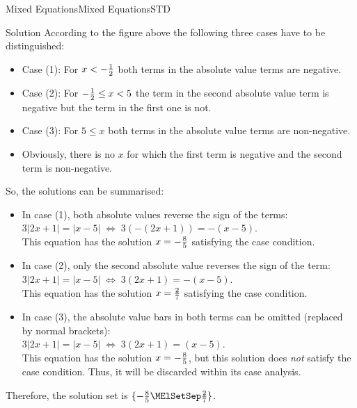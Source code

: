 \begin{MXContent}{Mixed Equations}{Mixed Equations}{STD}
\begin{MExercise}
\begin{MHint}{Solution}
According to the figure above the following three cases have to be distinguished:
\begin{itemize}
\item{Case (1): For $x<-\tfrac{1}{2}$ both terms in the absolute value terms are negative.}
\item{Case (2): For $-\tfrac{1}{2}\leq x<5$ the term in the second absolute value term is negative but the 
term in the first one is not.}
\item{Case (3): For $5\leq x$ both terms in the absolute value terms are non-negative.}
\item{Obviously, there is no $x$ for which the first term is negative and the second 
term is non-negative.}
\end{itemize}

So, the solutions can be summarised:
\begin{itemize}
\item{In case (1), both absolute values reverse the sign of the terms:\\ $3|2x+1|=|x-5|\;\Leftrightarrow\;3(-(2x+1)) = -(x-5)$.\\
This equation has the solution $x=-\tfrac{8}{5}$ satisfying the case condition.}
\item{In case (2), only the second absolute value reverses the sign of the term: \\$3|2x+1|=|x-5|\;\Leftrightarrow\;3(2x+1) = -(x-5)$.\\
This equation has the solution $x=\tfrac{2}{7}$ satisfying the case condition.}
\item{In case (3), the absolute value bars in both terms can be omitted (replaced by normal brackets): \\
 $3|2x+1|=|x-5|\;\Leftrightarrow\;3(2x+1) = (x-5)$.\\
This equation has the solution $x=-\tfrac{8}{5}$, but this solution does \textit{not} 
satisfy the case condition. Thus, it will be discarded within its case analysis.}
\end{itemize}
Therefore, the solution set is $\lbrace -\Mtfrac85\MElSetSep \Mtfrac27\rbrace$.
\end{MHint}
\end{MExercise}


\end{MXContent}


